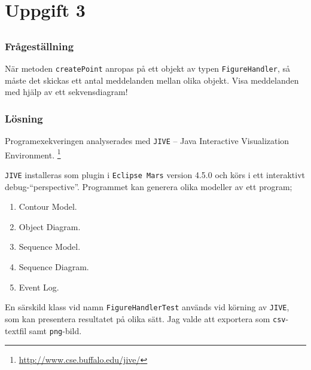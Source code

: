 %
%

\section{Uppgift 3}\label{sec:uppg3}

\subsection{}\label{sec:uppg3a}
\subsubsection*{Frågeställning}
När metoden \texttt{createPoint} anropas på ett objekt av typen
\texttt{FigureHandler}, så måste det skickas ett antal meddelanden mellan olika
objekt. Visa meddelanden med hjälp av ett sekvensdiagram!

\subsubsection*{Lösning}
Programexekveringen analyserades med \texttt{JIVE} -- Java Interactive
Visualization Environment. \footnote{\url{http://www.cse.buffalo.edu/jive/}}

\texttt{JIVE} installeras som plugin i \texttt{Eclipse Mars} version 4.5.0 och
körs i ett interaktivt debug-``perspective''. Programmet kan generera olika
modeller av ett program;

\begin{enumerate}
\item Contour Model.
\item Object Diagram.
\item Sequence Model.
\item Sequence Diagram.
\item Event Log.
\end{enumerate}

En särskild klass vid namn \texttt{FigureHandlerTest} används vid körning
av \texttt{JIVE}, som kan presentera resultatet på olika sätt. Jag valde att
exportera som \texttt{csv}-textfil samt \texttt{png}-bild.

